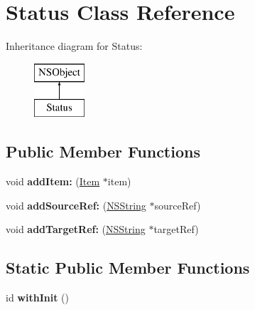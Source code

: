 \hypertarget{interface_status}{
\section{\-Status \-Class \-Reference}
\label{interface_status}
}
\-Inheritance diagram for \-Status\-:\begin{figure}[H]
\begin{center}
\leavevmode
\includegraphics[height=2.000000cm]{interface_status}
\end{center}
\end{figure}
\subsection*{\-Public \-Member \-Functions}
\begin{DoxyCompactItemize}
\item 
\hypertarget{interface_status_a8595de08174a5811eb5fc20e2f267a64}{
void {\bfseries add\-Item\-:} (\hyperlink{interface_item}{\-Item} $\ast$item)}
\label{interface_status_a8595de08174a5811eb5fc20e2f267a64}

\item 
\hypertarget{interface_status_a802a44599a0d1c0231ada34f5efaeae7}{
void {\bfseries add\-Source\-Ref\-:} (\hyperlink{class_n_s_string}{\-N\-S\-String} $\ast$source\-Ref)}
\label{interface_status_a802a44599a0d1c0231ada34f5efaeae7}

\item 
\hypertarget{interface_status_a2f91a213551fefc400c408c16580d163}{
void {\bfseries add\-Target\-Ref\-:} (\hyperlink{class_n_s_string}{\-N\-S\-String} $\ast$target\-Ref)}
\label{interface_status_a2f91a213551fefc400c408c16580d163}

\end{DoxyCompactItemize}
\subsection*{\-Static \-Public \-Member \-Functions}
\begin{DoxyCompactItemize}
\item 
\hypertarget{interface_status_a8c5cf015823aa447a64cfea567775ad5}{
id {\bfseries with\-Init} ()}
\label{interface_status_a8c5cf015823aa447a64cfea567775ad5}

\end{DoxyCompactItemize}
